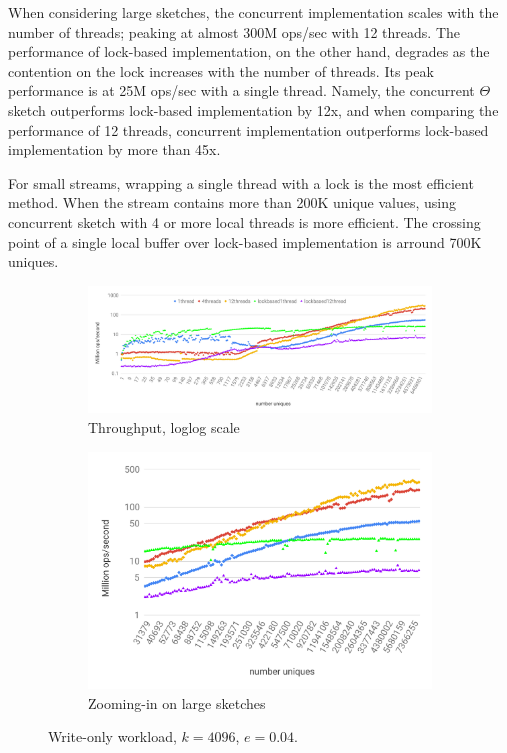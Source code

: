 When considering large sketches, the concurrent implementation scales with the number of threads; peaking at almost 300M ops/sec with 12 threads. The performance of lock-based implementation, on the other hand, degrades as the contention on the lock increases with the number of threads. Its peak performance is at 25M ops/sec with a single thread. Namely, the concurrent $\Theta$ sketch outperforms lock-based implementation by 12x, and when comparing the performance of 12 threads, concurrent implementation outperforms lock-based implementation by more than 45x. 

For small streams, wrapping a single thread with a lock is the most efficient method. When the stream contains more than 200K unique values, using concurrent sketch with 4 or more local threads is more efficient. The crossing point of a single local buffer over lock-based implementation is arround 700K uniques.
 
\begin{figure}[tb]
\setlength{\abovecaptionskip}{0pt}
\setlength{\belowcaptionskip}{0pt}
\setlength\textfloatsep{0pt}
\centering
\begin{subfigure}{1.3\columnwidth}\centering
\includegraphics[width=\textwidth]{images/theta-write-only.pdf}
\caption{Throughput, loglog scale}
\label{fig:throughput:native}
\end{subfigure}
\begin{subfigure}{0.7\columnwidth}\centering
\includegraphics[width=\textwidth]{images/theta-write-only-zoomin.pdf}
\caption{Zooming-in on large sketches}
\label{fig:throughput:large}
\end{subfigure}
  \caption{Write-only workload, $k = 4096$, $e=0.04$.}
  \label{fig:throughput}
\end{figure}

